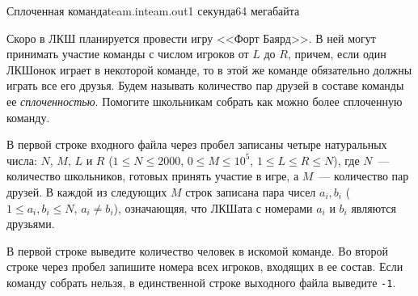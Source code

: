 \begin{problem}{Сплоченная команда}{team.in}{team.out}{1 секунда}{64 мегабайта}{}


Скоро в ЛКШ планируется провести игру <<Форт Баярд>>. В ней могут принимать участие команды с числом игроков 
от $L$ до $R$, причем, если один ЛКШонок играет в некоторой команде, 
то в этой же команде обязательно должны играть все его друзья. Будем называть количество пар друзей в составе
команды ее \emph{сплоченностью}. Помогите школьникам собрать как можно более сплоченную команду.

\InputFile

В первой строке входного файла через пробел записаны четыре натуральных числа: $N$, $M$, $L$ и $R$ ($1 \le N \le 2000$,
$0 \le M \le 10^5$, $1 \le L \le R \le N$), где $N$~--- количество школьников, готовых принять участие в игре, а 
$M$~--- количество пар друзей. В каждой из следующих $M$ строк записана пара чисел $a_i, b_i$ ($1 \le a_i, b_i \le N$, $a_i \neq b_i$), означающяя, что
ЛКШата с номерами $a_i$ и $b_i$ являются друзьями.

\OutputFile

В первой строке выведите количество человек в искомой команде. Во второй строке через пробел запишите номера
всех игроков, входящих в ее состав. Если команду собрать нельзя, в единственной строке выходного файла
выведите \texttt{-1}.

\Examples

\begin{example}
%
%
\end{example}

\end{problem}
